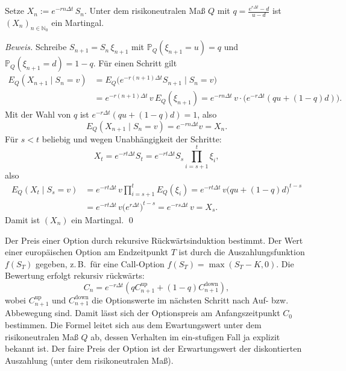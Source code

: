 \begin{lemma}
Setze $X_n := e^{-r n \Delta t}\, S_n$. Unter dem risikoneutralen Maß $Q$ mit 
$q=\frac{e^{r\Delta t}-d}{u-d}$ ist $(X_n)_{n\in\mathbb N_0}$ ein Martingal.

\textit{Beweis.} Schreibe $S_{n+1}=S_n\,\xi_{n+1}$ mit 
$\mathbb P_Q(\xi_{n+1}=u)=q$ und $\mathbb P_Q(\xi_{n+1}=d)=1-q$. Für einen Schritt gilt
$$
\begin{aligned}
E_Q(X_{n+1}\mid S_n=v)
&= E_Q\!\big(e^{-r(n+1)\Delta t} S_{n+1}\mid S_n=v\big) \\
&= e^{-r(n+1)\Delta t}\, v \, E_Q(\xi_{n+1})
= e^{-rn\Delta t}\, v \cdot \big(e^{-r\Delta t}(q u + (1-q)d)\big).
\end{aligned}
$$
Mit der Wahl von $q$ ist $e^{-r\Delta t}(q u + (1-q)d)=1$, also 
$$E_Q(X_{n+1}\mid S_n=v)=e^{-rn\Delta t} v = X_n.$$
Für $s<t$ beliebig und wegen Unabhängigkeit der Schritte:
$$
X_t
= e^{-rt\Delta t} S_t
= e^{-rt\Delta t} S_s \prod_{i=s+1}^{t} \xi_i,
$$
also
$$
\begin{aligned}
E_Q(X_t\mid S_s=v)
&= e^{-rt\Delta t}\, v \prod_{i=s+1}^{t} E_Q(\xi_i)
= e^{-rt\Delta t}\, v \big(q u + (1-q)d\big)^{t-s} \\
&= e^{-rt\Delta t}\, v \big(e^{r\Delta t}\big)^{t-s}
= e^{-rs\Delta t}\, v
= X_s.
\end{aligned}
$$
Damit ist $(X_n)$ ein Martingal. \qed
\end{lemma}

\begin{satz}
Der Preis einer Option durch rekursive Rückwärtsinduktion bestimmt. 
Der Wert einer europäischen Option am Endzeitpunkt $T$ ist durch die Auszahlungsfunktion $f(S_T)$ gegeben, z.\,B.\ für eine Call-Option $f(S_T) = \max(S_T - K, 0)$.
Die Bewertung erfolgt rekursiv rückwärts:
$$
C_n = e^{-r \Delta t} \left( q C_{n+1}^\text{up} + (1-q) C_{n+1}^\text{down} \right),
$$
wobei $C_{n+1}^\text{up}$ und $C_{n+1}^\text{down}$ die Optionswerte im nächsten Schritt nach Auf- bzw. Abbewegung sind.
Damit lässt sich der Optionspreis am Anfangszeitpunkt $C_0$ bestimmen. Die Formel leitet
sich aus dem Ewartungswert unter dem risikoneutralen Maß $Q$ ab, dessen Verhalten im ein-stufigen Fall ja explizit bekannt ist.
Der faire Preis der Option ist der Erwartungswert der diskontierten Auszahlung (unter dem risikoneutralen Maß).
\end{satz}

